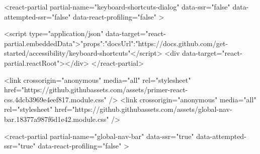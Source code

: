 <react-partial
  partial-name="keyboard-shortcuts-dialog"
  data-ssr="false"
  data-attempted-ssr="false"
  data-react-profiling="false"
>
  
  <script type="application/json" data-target="react-partial.embeddedData">{"props":{"docsUrl":"https://docs.github.com/get-started/accessibility/keyboard-shortcuts"}}</script>
  <div data-target="react-partial.reactRoot"></div>
</react-partial>





      

          

                  <link crossorigin="anonymous" media="all" rel="stylesheet" href="https://github.githubassets.com/assets/primer-react-css.4dcb3969e4eef817.module.css" />
<link crossorigin="anonymous" media="all" rel="stylesheet" href="https://github.githubassets.com/assets/global-nav-bar.18377a987f6d1e42.module.css" />

<react-partial
  partial-name="global-nav-bar"
  data-ssr="true"
  data-attempted-ssr="true"
  data-react-profiling="false"
>
  

